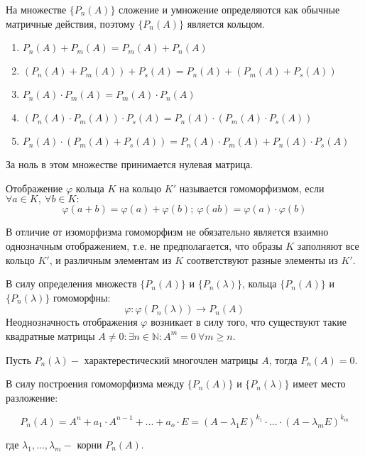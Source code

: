 \documentclass[a4paper, 12pt]{article}
\begin{document}
На множестве $\{P_n(A)\}$ сложение и умножение определяются как обычные матричные действия, поэтому $\{P_n(A)\}$ является кольцом.

\begin{enumerate}
	\item $P_n(A) + P_m(A) = P_m(A) + P_n(A)$
	\item $(P_n(A) + P_m(A)) + P_s(A) = P_n(A) + (P_m(A) + P_s(A))$
	\item $P_n(A) \cdot P_m(A) = P_m(A) \cdot P_n(A)$
	\item $(P_n(A) \cdot P_m(A)) \cdot P_s(A) = P_n(A) \cdot (P_m(A) \cdot P_s(A))$
	\item $P_n(A) \cdot (P_m(A) + P_s(A)) = P_n(A) \cdot P_m(A) + P_n(A) \cdot P_s(A)$
\end{enumerate}

За ноль в этом множестве принимается нулевая матрица.

\begin{definition}
Отображение $\varphi$ кольца $K$ на кольцо $K'$ называется гомоморфизмом, если $\forall a \in K,~ \forall b \in K:$
\[\varphi(a+b) = \varphi(a) + \varphi(b);~ \varphi(ab) = \varphi(a) \cdot \varphi(b)\] 
\end{definition}

В отличие от изоморфизма гомоморфизм не обязательно является взаимно однозначным отображением, т.е. не предполагается, что образы $K$ заполняют все кольцо $K'$, и различным элементам из $K$ соответствуют разные элементы из $K'$.

В силу определения множеств $\{P_n(A)\}$ и $\{P_n(\lambda)\}$, кольца $\{P_n(A)\}$ и $\{P_n(\lambda)\}$ гомоморфны:
\[\varphi: \varphi(P_n(\lambda)) \longrightarrow P_n(A)\]
Неоднозначность отображения $\varphi$ возникает в силу того, что существуют такие квадратные матрицы $A \neq 0: \exists n \in \mathbb {N}: A^m = 0~ \forall m \geq n$.

\begin{theorem}
Пусть $P_n(\lambda) - $ характерестический многочлен матрицы $A$, тогда $P_n(A) = 0$.
\end{theorem}

В силу построения гомоморфизма между $\{P_n(A)\}$ и $\{P_n(\lambda)\}$ имеет место разложение:

\[P_n(A) = A^n + a_1 \cdot A^{n-1} + ... + a_o \cdot E = (A - \lambda_1 E)^{k_1} \cdot ... \cdot (A - \lambda_m E)^{k_m}\]

где $\lambda_1, ..., \lambda_m - $ корни $P_n(A)$.
\end{document}
